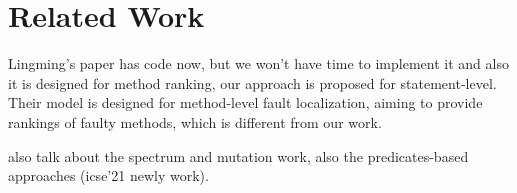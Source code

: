 \section{Related Work}


Lingming's paper has code now, but we won't have time to implement it and also it is designed for method ranking, our approach is proposed for statement-level. Their model is designed for method-level fault localization, aiming to provide rankings of faulty methods, which is different from our work.

also talk about the spectrum and mutation work, also the predicates-based approaches (icse'21 newly work).

